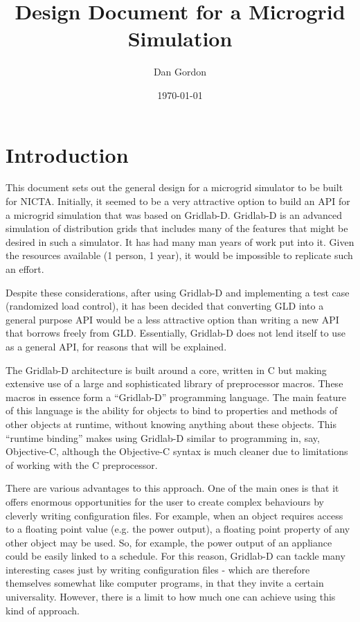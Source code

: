 \documentclass[12pt]{article}
\title{Design Document for a Microgrid Simulation}
\author{Dan Gordon}
\date{\today}
\begin{document}
\maketitle


\section{Introduction}
This document sets out the general design for a microgrid simulator to be built for NICTA. Initially, it seemed to be a very attractive option to build an API for a microgrid simulation that was based on Gridlab-D. Gridlab-D is an advanced simulation of distribution grids that includes many of the features that might be desired in such a simulator. It has had many man years of work put into it. Given the resources available (1 person, 1 year), it would be impossible to replicate such an effort. 

Despite these considerations, after using Gridlab-D and implementing a test case (randomized load control), it has been decided that converting GLD into a general purpose API would be a less attractive option than writing a new API that borrows freely from GLD. Essentially, Gridlab-D does not lend itself to use as a general API, for reasons that will be explained.

The Gridlab-D architecture is built around a core, written in C but making extensive use of a large and sophisticated library of preprocessor macros. These macros in essence form a ``Gridlab-D'' programming language. The main feature of this language is the ability for objects to bind to properties and methods of other objects at runtime, without knowing anything about these objects. This ``runtime binding'' makes using Gridlab-D similar to programming in, say, Objective-C, although the Objective-C syntax is much cleaner due to limitations of working with the C preprocessor.

There are various advantages to this approach. One of the main ones is that it offers enormous opportunities for the user to create complex behaviours by cleverly writing configuration files. For example, when an object requires access to a floating point value (e.g. the power output), a floating point property of any other object may be used. So, for example, the power output of an appliance could be easily linked to a schedule. For this reason, Gridlab-D can tackle many interesting cases just by writing configuration files - which are therefore themselves somewhat like computer programs, in that they invite a certain universality. However, there is a limit to how much one can achieve using this kind of approach.
\end{document}
